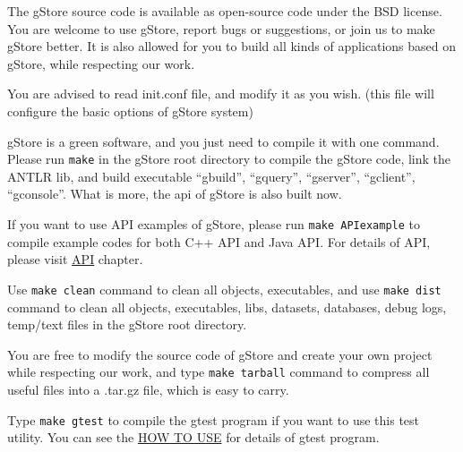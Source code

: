 \documentclass[titlepage, a4paper, 12pt]{article}
\begin{document}

The gStore source code is available as open-source code under the BSD license. You are welcome to use gStore, report bugs or suggestions, or join us to make gStore better. It is also allowed for you to build all kinds of applications based on gStore, while respecting our work.

\clearpage


You are advised to read init.conf file, and modify it as you wish. (this file will configure the basic options of gStore system)

gStore is a green software, and you just need to compile it with one command. Please run \texttt{make} in the gStore root directory to compile the gStore code, link the ANTLR lib, and build executable ``gbuild'', ``gquery'', ``gserver'', ``gclient'', ``gconsole''. What is more, the api of gStore is also built now.

If you want to use API examples of gStore, please run \texttt{make\ APIexample} to compile example codes for both C++ API and Java API. For details of API, please visit \hyperref[chapter05]{API} chapter.

Use \texttt{make\ clean} command to clean all objects, executables, and use \texttt{make\ dist} command to clean all objects, executables, libs, datasets, databases, debug logs, temp/text files in the gStore root directory.

You are free to modify the source code of gStore and create your own project while respecting our work, and type \texttt{make\ tarball} command to compress all useful files into a .tar.gz file, which is easy to carry.

Type \texttt{make\ gtest} to compile the gtest program if you want to use this test utility. You can see the \hyperref[chapter04]{HOW TO USE} for details of gtest program.

\clearpage

\end{document}
